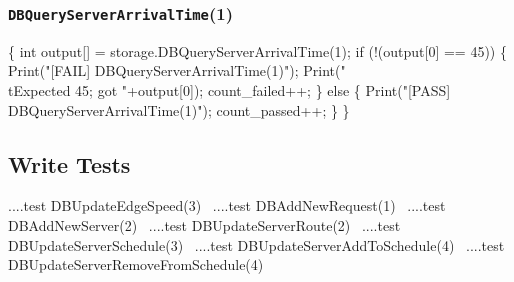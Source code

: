 \documentclass{article}
\def\nwendcode{\endtrivlist \endgroup}
\let\nwdocspar=\par
\theoremstyle{definition}
\begin{document}
\subsubsection{{\tt{}DBQueryServerArrivalTime}(1)}
\nwenddocs{}\endmoddef{}
\{
  int output[] = storage.DBQueryServerArrivalTime(1);
  if (!(output[0] == 45)) \{
    Print("[FAIL] DBQueryServerArrivalTime(1)");
    Print("\\tExpected 45; got "+output[0]);
    count_failed++;
  \} else \{
    Print("[PASS] DBQueryServerArrivalTime(1)");
    count_passed++;
  \}
\}
\nwendcode{}\nwdocspar

\subsection{Write Tests}
\label{sec:write-tests}
\nwenddocs{}\endmoddef{}
\LA{}....test \code{}DBUpdateEdgeSpeed\edoc{}(3)~{\nwtagstyle{}}\RA{}
\LA{}....test \code{}DBAddNewRequest\edoc{}(1)~{\nwtagstyle{}}\RA{}
\LA{}....test \code{}DBAddNewServer\edoc{}(2)~{\nwtagstyle{}}\RA{}
\LA{}....test \code{}DBUpdateServerRoute\edoc{}(2)~{\nwtagstyle{}}\RA{}
\LA{}....test \code{}DBUpdateServerSchedule\edoc{}(3)~{\nwtagstyle{}}\RA{}
\LA{}....test \code{}DBUpdateServerAddToSchedule\edoc{}(4)~{\nwtagstyle{}}\RA{}
\LA{}....test \code{}DBUpdateServerRemoveFromSchedule\edoc{}(4)~{\nwtagstyle{}}\RA{}
\nwendcode{}\nwdocspar
\end{document}
